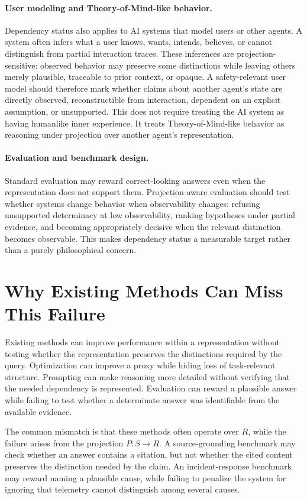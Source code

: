 \documentclass[11pt]{article}
\begin{document}
\paragraph{User modeling and Theory-of-Mind-like behavior.}
Dependency status also applies to AI systems that model users or other agents. A system often infers what a user knows, wants, intends, believes, or cannot distinguish from partial interaction traces. These inferences are projection-sensitive: observed behavior may preserve some distinctions while leaving others merely plausible, traceable to prior context, or opaque. A safety-relevant user model should therefore mark whether claims about another agent's state are directly observed, reconstructible from interaction, dependent on an explicit assumption, or unsupported. This does not require treating the AI system as having humanlike inner experience. It treats Theory-of-Mind-like behavior as reasoning under projection over another agent's representation.

\paragraph{Evaluation and benchmark design.}
Standard evaluation may reward correct-looking answers even when the representation does not support them. Projection-aware evaluation should test whether systems change behavior when observability changes: refusing unsupported determinacy at low observability, ranking hypotheses under partial evidence, and becoming appropriately decisive when the relevant distinction becomes observable. This makes dependency status a measurable target rather than a purely philosophical concern.

\section{Why Existing Methods Can Miss This Failure}

Existing methods can improve performance within a representation without testing whether the representation preserves the distinctions required by the query. Optimization can improve a proxy while hiding loss of task-relevant structure. Prompting can make reasoning more detailed without verifying that the needed dependency is represented. Evaluation can reward a plausible answer while failing to test whether a determinate answer was identifiable from the available evidence.

The common mismatch is that these methods often operate over $R$, while the failure arises from the projection $P:S\rightarrow R$. A source-grounding benchmark may check whether an answer contains a citation, but not whether the cited content preserves the distinction needed by the claim. An incident-response benchmark may reward naming a plausible cause, while failing to penalize the system for ignoring that telemetry cannot distinguish among several causes.
\end{document}
